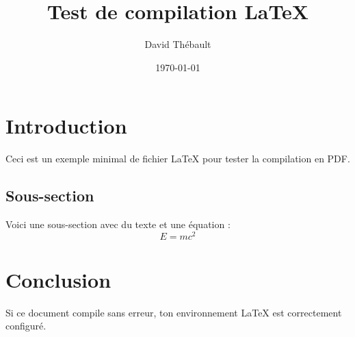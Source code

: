 \documentclass{article}
\title{Test de compilation LaTeX}
\author{David Thébault}
\date{\today}
\begin{document}
\maketitle %

\section{Introduction}
Ceci est un exemple minimal de fichier LaTeX pour tester la compilation en PDF.

\subsection{Sous-section}
Voici une sous-section avec du texte et une équation :
\[ E = mc^2 \]

\section{Conclusion}
Si ce document compile sans erreur, ton environnement LaTeX est correctement configuré.
\end{document}
